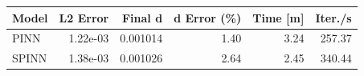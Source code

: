\begin{tabular}{lrrrrr}
\toprule
Model & L2 Error & Final d & d Error (\%) & Time [m] & Iter./s \\
\midrule
PINN & 1.22e-03 & 0.001014 & 1.40 & 3.24 & 257.37 \\
SPINN & 1.38e-03 & 0.001026 & 2.64 & 2.45 & 340.44 \\
\bottomrule
\end{tabular}

